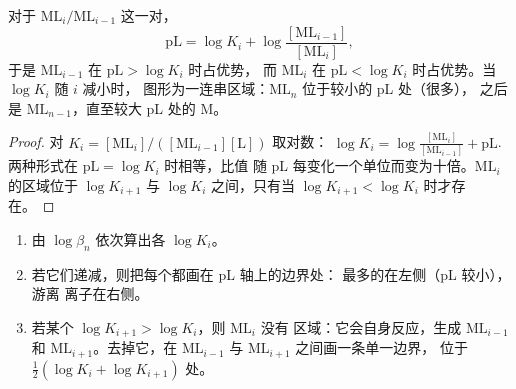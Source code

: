 \begin{proposition}[pL 中的边界]\label{prop:b1:complexation:pl-boundaries}
对于 $\mathrm{ML}_i/\mathrm{ML}_{i-1}$ 这一对，
\[
  \mathrm{pL} = \log K_i + \log\frac{[\mathrm{ML}_{i-1}]}{[\mathrm{ML}_i]} ,
\]
于是 $\mathrm{ML}_{i-1}$ 在 $\mathrm{pL} > \log K_i$ 时占优势，
而 $\mathrm{ML}_i$ 在 $\mathrm{pL} < \log K_i$ 时占优势。当 $\log K_i$ 随 $i$ 减小时，
图形为一连串区域：$\mathrm{ML}_n$ 位于较小的 pL 处（很多），
之后是 $\mathrm{ML}_{n-1}$，直至较大 pL 处的 M。
\end{proposition}

\begin{proof}
对 $K_i = [\mathrm{ML}_i]/([\mathrm{ML}_{i-1}][\mathrm{L}])$ 取对数：
$\log K_i = \log\frac{[\mathrm{ML}_i]}{[\mathrm{ML}_{i-1}]} + \mathrm{pL}$.
两种形式在 $\mathrm{pL} = \log K_i$ 时相等，比值
随 pL 每变化一个单位而变为十倍。$\mathrm{ML}_i$ 的区域位于
$\log K_{i+1}$ 与 $\log K_i$ 之间，只有当 $\log K_{i+1} < \log
K_i$ 时才存在。
\end{proof}

\begin{method}[绘制 pL 图]\label{met:b1:complexation:pl-diagram}
\begin{enumerate}
  \item 由 $\log\beta_n$ 依次算出各 $\log K_i$。
  \item 若它们递减，则把每个都画在 pL 轴上的边界处：
        最多的在左侧（pL 较小），游离
        离子在右侧。
  \item 若某个 $\log K_{i+1} > \log K_i$，则 $\mathrm{ML}_i$ 没有
        区域：它会自身反应，生成 $\mathrm{ML}_{i-1}$ 和
        $\mathrm{ML}_{i+1}$。去掉它，在
        $\mathrm{ML}_{i-1}$ 与 $\mathrm{ML}_{i+1}$ 之间画一条单一边界，
        位于 $\frac12(\log K_i + \log K_{i+1})$ 处。
\end{enumerate}
\end{method}

